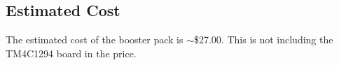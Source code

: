 \documentclass{article}
\begin{document}
	\subsection{Estimated Cost}
		The estimated cost of the booster pack is $\sim$\$27.00. This is not including the TM4C1294 board in the price. 

\end{document}
